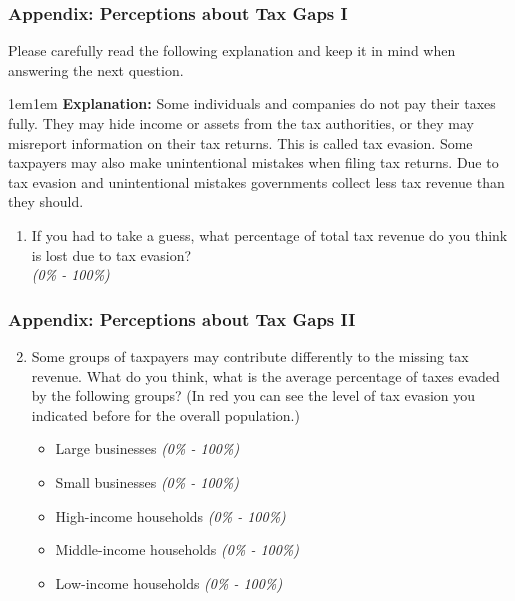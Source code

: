 \documentclass{beamer}
\begin{document}
\begin{frame}[label=Prior_Perceptions_Appendix]
\frametitle{Appendix: Perceptions about Tax Gaps I}
\footnotesize
\noindent Please carefully read the following explanation and keep it in mind when answering the next question. \\
\vspace{0.5em}
\begin{adjustwidth}{1em}{1em} \textbf{Explanation:} Some individuals and companies do not pay their taxes fully. They may hide income or assets from the tax authorities, or they may misreport information on their tax returns. This is called tax evasion. Some taxpayers may also make unintentional mistakes when filing tax returns. Due to tax evasion and unintentional mistakes governments collect less tax revenue than they should. 
\end{adjustwidth}
\begin{enumerate}
    \item If you had to take a guess, what percentage of total tax revenue do you think is lost due to tax evasion? \\
    \textit{(0\% - 100\%)}
\end{enumerate}
\end{frame}
\begin{frame}
\frametitle{Appendix: Perceptions about Tax Gaps II}
\footnotesize
\begin{enumerate}
\setcounter{enumi}{1}
    \item Some groups of taxpayers may contribute differently to the missing tax revenue. What do you think, what is the average percentage of taxes evaded by the following groups? (In red you can see the level of tax evasion you indicated before for the overall population.)
    \begin{itemize}
        \item Large businesses \textit{(0\% - 100\%)}
        \item Small businesses \textit{(0\% - 100\%)}
        \item High-income households \textit{(0\% - 100\%)}
        \item Middle-income households \textit{(0\% - 100\%)}
        \item Low-income households \textit{(0\% - 100\%)}
    \end{itemize}
\end{enumerate}
\vfill
\hfill
\hyperlink{Prior_Perceptions}{}
\end{frame}
\end{document}
